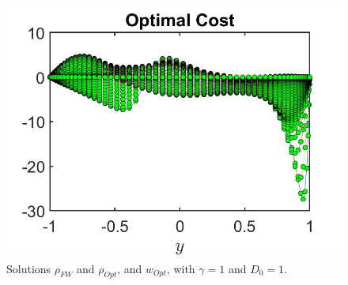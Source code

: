 \documentclass[11pt, a4paper]{article}
\theoremstyle{definition}
\begin{document}
\begin{figure}[h]
	\includegraphics[scale=0.3]{DFlwOpt3.jpg}
	\caption{Solutions $\rho_{FW}$ and $\rho_{Opt}$,  and $w_{Opt}$, with $\gamma = 1$ and $D_0 = 1$.}
	\label{rhoDFl3}
\end{figure}
\end{document}
